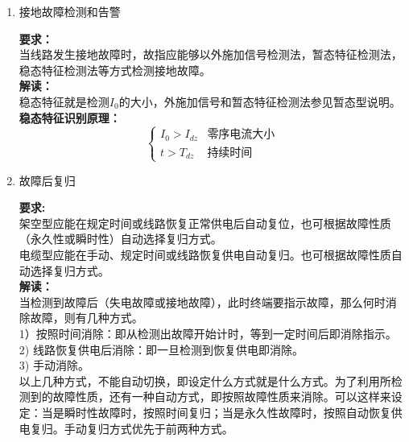 \documentclass{article}
\begin{document}
\begin{CJK}{UTF8}{gbsn}
\begin{enumerate}
	\textbf{原理：}
	\footnote{$I_x$是任意相电流，$I_z$是残余电流，$U_x$是场强,$U_{dz}$可以取0.3U，U为故障前的场强。}
	\begin{equation}	
		\left\{ \begin{array}{ll}
				\Delta I_x>I_{dz} & \textrm{启动条件}\\
			    t>T_{dz} & \textrm{突变电流持续的时间}\\
				I_z<5A & \textrm{持续时间后，剩余电流}\\ 
			\Delta U_x>U_{dz}
		\end{array}
		\right .
	\end{equation}
\item	接地故障检测和告警
	\par
	\textbf{要求：}\\当线路发生接地故障时，故指应能够以外施加信号检测法，暂态特征检测法，稳态特征检测法等方式检测接地故障。\\
	\textbf{解读：}	\\稳态特征就是检测$I_0$的大小，外施加信号和暂态特征检测法参见暂态型说明。\\
	\textbf{稳态特征识别原理：}\\
	\begin{equation}
		\left\{
			\begin{array}{ll}
				I_0>I_{dz} & \textrm{零序电流大小}\\
				  t>T_{dz} & \textrm{持续时间}
			\end{array}
			\right.
	\end{equation}
\item	故障后复归
	\par
	\textbf{要求:}\\
	架空型应能在规定时间或线路恢复正常供电后自动复位，也可根据故障性质（永久性或瞬时性）自动选择复归方式。\\
	电缆型应能在手动、规定时间或线路恢复供电自动复归。也可根据故障性质自动选择复归方式。\\
	\textbf{解读：}\\
	当检测到故障后（失电故障或接地故障），此时终端要指示故障，那么何时消除故障，则有几种方式。\\
	1）按照时间消除：即从检测出故障开始计时，等到一定时间后即消除指示。\\	
	2) 线路恢复供电后消除：即一旦检测到恢复供电即消除。\\
	3) 手动消除。\\
	以上几种方式，不能自动切换，即设定什么方式就是什么方式。为了利用所检测到的故障性质，还有一种自动方式，即按照故障性质来消除。可以这样来设定：当是瞬时性故障时，按照时间复归；当是永久性故障时，按照自动恢复供电复归。手动复归方式优先于前两种方式。\\

\end{enumerate}
\end{CJK}
\end{document}
